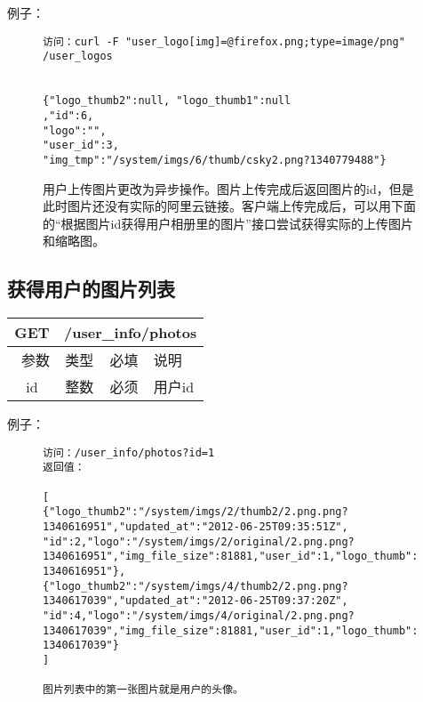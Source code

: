 例子：

\begin{figure}[H]
\begin{verbatim}
访问：curl -F "user_logo[img]=@firefox.png;type=image/png" 
/user_logos


{"logo_thumb2":null, "logo_thumb1":null
,"id":6,
"logo":"",
"user_id":3,
"img_tmp":"/system/imgs/6/thumb/csky2.png?1340779488"}

\end{verbatim}

用户上传图片更改为异步操作。图片上传完成后返回图片的id，但是此时图片还没有实际的阿里云链接。客户端上传完成后，可以用下面的“根据图片id获得用户相册里的图片”接口尝试获得实际的上传图片和缩略图。

\end{figure}



\subsection{获得用户的图片列表}

\begin{table}[H]
   \begin{center}
\begin{tabular}{|c|c|c|p{12cm}|}
\hline
GET & \multicolumn{3}{|c|}{/user\_info/photos} \\
\hline\hline
 \  参数  & 类型 & 必填 &  说明  \\
\hline
 id  & 整数 & 必须 &  用户id\\
\hline
\end{tabular}
   \end{center}
\end{table}


例子：

\begin{figure}[H]
\begin{verbatim}
访问：/user_info/photos?id=1
返回值：

[
{"logo_thumb2":"/system/imgs/2/thumb2/2.png.png?1340616951","updated_at":"2012-06-25T09:35:51Z",
"id":2,"logo":"/system/imgs/2/original/2.png.png?1340616951","img_file_size":81881,"user_id":1,"logo_thumb":"/system/imgs/2/thumb/2.png.png?1340616951"},
{"logo_thumb2":"/system/imgs/4/thumb2/2.png.png?1340617039","updated_at":"2012-06-25T09:37:20Z",
"id":4,"logo":"/system/imgs/4/original/2.png.png?1340617039","img_file_size":81881,"user_id":1,"logo_thumb":"/system/imgs/4/thumb/2.png.png?1340617039"}
]

图片列表中的第一张图片就是用户的头像。


\end{verbatim}
\end{figure}



